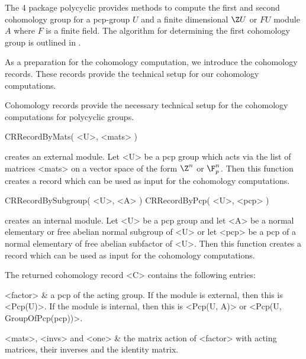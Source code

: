 

The {\GAP} 4 package {\sf polycyclic} provides methods to compute the
first and second cohomology group for a pcp-group $U$ and a finite
dimensional $\Z U$ or $FU$ module $A$ where $F$ is a finite field. The
algorithm for determining the first cohomology group is outlined in
\cite{Eic00}.

As a preparation for the cohomology computation, we introduce the 
cohomology records. These records provide the technical setup for 
our cohomology computations.


Cohomology records provide the necessary technical setup for the
cohomology computations for polycyclic groups.

\>CRRecordByMats( <U>, <mats> )

creates an external module. Let <U> be a pcp group which acts via the 
list of matrices <mats> on a vector space of the form $\Z^n$ or $\F_p^n$.
Then this function creates a record which can be used as input for the
cohomology computations.

\>CRRecordBySubgroup( <U>, <A> )
\>CRRecordByPcp( <U>, <pcp> )

creates an internal module. Let <U> be a pcp group and let <A> be a 
normal elementary or free abelian normal subgroup of <U> or let <pcp>
be a pcp of a normal elementary of free abelian subfactor of <U>. Then
this function creates a record which can be used as input for the
cohomology computations. 

The returned cohomology record <C> contains the following entries:

\beginitems
<factor> &
      a pcp of the acting group. If the module is external, then this is
      <Pcp(U)>. If the module is internal, then this is <Pcp(U, A)> or
      <Pcp(U, GroupOfPcp(pcp))>.

<mats>, <invs> and <one> &
      the matrix action of <factor> with acting matrices, their inverses
      and the identity matrix.

